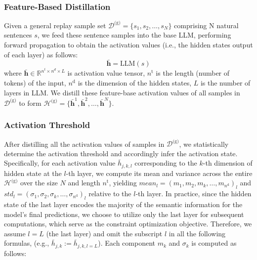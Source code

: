 \subsubsection{Feature-Based Distillation}
Given a general replay sample set $\mathcal{D}^{\text{(g)}} = \{s_1, s_2, \dots, s_N\}$ comprising N natural sentences $s$, we feed these sentence samples into the base LLM, performing forward propagation to obtain the activation values (i.e., the hidden states output of each layer) as follows:
\begin{equation}
    \bar{\mathbf{h}} = \text{LLM}(s)
\end{equation}
where $\bar{\mathbf{h}}\in\mathbb{R}^{n^{t} \times n^{d} \times L}$ is activation value tensor,
$n^{\text{t}}$ is the length (number of tokens) of the input,
$n^{\text{d}}$ is the dimension of the hidden states,
$L$ is the number of layers in LLM.
We distill these feature-base activation values of all samples in $\mathcal{D}^{\text{(g)}}$ to form $\mathcal{H}^{\text{(g)}}=\{\bar{\mathbf{h}}^1,\bar{\mathbf{h}}^2,\dots,\bar{\mathbf{h}}^N\}$.

\subsubsection{Activation Threshold}
After distilling all the activation values of samples in $\mathcal{D}^{\text{(g)}}$,
we statistically determine the activation threshold and accordingly infer the activation state.
Specifically, for each activation value $\bar{h}_{j,k,l}$ corresponding to the $k$-th dimension of hidden state at the $l$-th layer, we compute its mean and variance across the entire $\mathcal{H}^{\text{(g)}}$ over the size $N$ and length $n^{\text{t}}$,
yielding $mean_l = (m_1,m_2,m_k,\dots,m_{n^{\text{d}}})_l$ and $std_l = (\sigma_1,\sigma_2,\sigma_k,\dots,\sigma_{n^{\text{d}}})_l$ relative to the $l$-th layer.
In practice, since the hidden state of the last layer encodes the majority of the semantic information for the model's final predictions, we choose to utilize only the last layer for subsequent computations, which serve as the constraint optimization objective.
Therefore, we assume $l\!=\!L$ (the last layer) and omit the subscript $l$ in all the following formulas, (e.g., $\bar{h}_{j,k}\!:=\!\bar{h}_{j,k,l=L}$). Each component $m_k$ and $\sigma_k$ is computed as follows:


